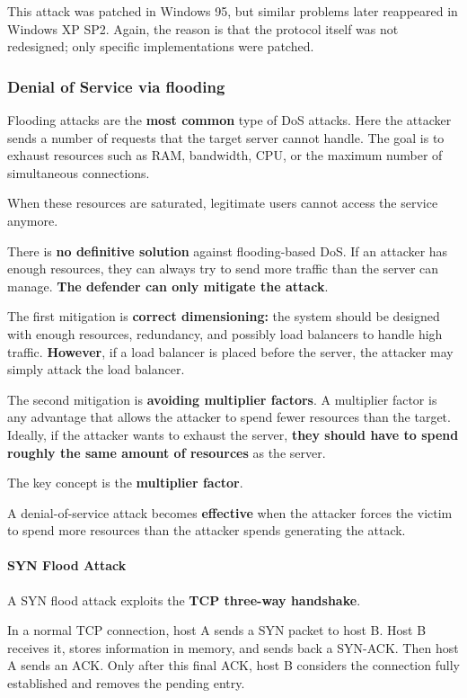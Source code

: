 \documentclass{article}
\begin{document}
This attack was patched in Windows 95, but similar problems later reappeared in Windows XP SP2. Again, the reason is that the protocol itself was not redesigned; only specific implementations were patched.

\subsubsection{Denial of Service via flooding}

Flooding attacks are the \textbf{most common} type of DoS attacks. Here the attacker sends a number of requests that the target server cannot handle. The goal is to exhaust resources such as RAM, bandwidth, CPU, or the maximum number of simultaneous connections.

When these resources are saturated, legitimate users cannot access the service anymore.

There is \textbf{no definitive solution} against flooding-based DoS. If an attacker has enough resources, they can always try to send more traffic than the server can manage. \textbf{The defender can only mitigate the attack}.

The first mitigation is \textbf{correct dimensioning:} the system should be designed with enough resources, redundancy, and possibly load balancers to handle high traffic. \textbf{However}, if a load balancer is placed before the server, the attacker may simply attack the load balancer.

The second mitigation is \textbf{avoiding multiplier factors}. A multiplier factor is any advantage that allows the attacker to spend fewer resources than the target. Ideally, if the attacker wants to exhaust the server, \textbf{they should have to spend roughly the same amount of resources} as the server.

The key concept is the \textbf{multiplier factor}.

A denial-of-service attack becomes \textbf{effective} when the attacker forces the victim to spend more resources than the attacker spends generating the attack.

\paragraph{SYN Flood Attack}

A SYN flood attack exploits the \textbf{TCP three-way handshake}.

In a normal TCP connection, host A sends a SYN packet to host B. Host B receives it, stores information in memory, and sends back a SYN-ACK. Then host A sends an ACK. Only after this final ACK, host B considers the connection fully established and removes the pending entry.
\end{document}
